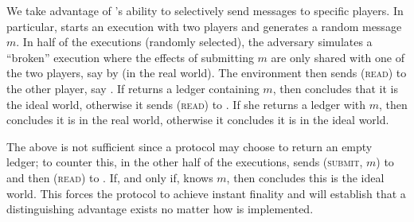 \begin{proofsketch}
  We take advantage of \perfectadv's ability to selectively send
  messages to specific players. In particular, \perfectenv{} starts
  an execution with two players and generates a random message $m$. In half of
  the executions (randomly selected),  the adversary simulates a ``broken''
  \perfectprot{} execution where the effects of submitting $m$ are only shared
  with one of the two players, say \alice{} by \perfectadv{} (in the
  real world). The environment then sends (\textsc{read}) to the other player,
  say \bob. If \bob{} returns a ledger containing $m$, then
  \perfectenv{} concludes that it is the ideal world, otherwise it
  sends (\textsc{read}) to \alice. If she returns a ledger with $m$, then
  \perfectenv{} concludes it is in the real world, otherwise it
  concludes it is in the ideal world.

  The above is not sufficient since a protocol may choose to return an empty
  ledger; to counter this, in the other half of the executions,
  \perfectenv{} sends (\textsc{submit}, $m$) to \alice{} and then
  (\textsc{read}) to \bob. If, and only if, \bob{} knows $m$, then
  \perfectenv{} concludes this is the ideal world. This forces the
  \perfectprot{} protocol to achieve instant finality and will establish that
  a distinguishing advantage exists no matter how \perfectprot{} is
  implemented.
\end{proofsketch}

